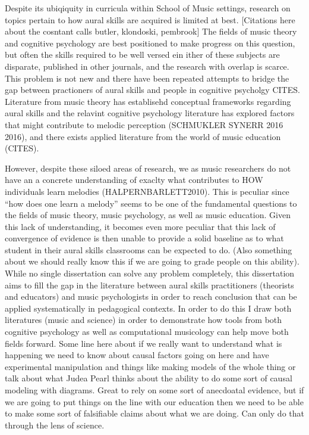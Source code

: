 \documentclass[]{book}
\begin{document}
Despite its ubiqiquity in curricula within School of Music settings, research on topics pertain to how aural skills are acquired is limited at best.
{[}Citations here about the cosntant calls butler, klondoski, pembrook{]}
The fields of music theory and cognitive psychology are best positioned to make progress on this question, but often the skills required to be well versed ein ither of these subjects are disparate, published in other journals, and the research with overlap is scarce.
This problem is not new and there have been repeated attempts to bridge the gap between practioners of aural skills and people in cognitive psycholgy CITES.
Literature from music theory has establisehd conceptual frameworks regarding aural skills \citet{karpinskiAuralSkillsAcquisition2000} and the relavint cognitive psychology literature has explored factors that might contribute to melodic perception (SCHMUKLER SYNERR 2016 2016), and there exists applied literature from the world of music education (CITES).

However, despite these siloed areas of research, we as music researchers do not have an a concrete understanding of exaclty what contributes to HOW individuals learn melodies (HALPERNBARLETT2010).
This is peculiar since ``how does one learn a melody'' seems to be one of the fundamental questions to the fields of music theory, music psychology, as well as music education.
Given this lack of understanding, it becomes even more peculiar that this lack of convergence of evidence is then unable to provide a solid baseline as to what student in their aural skills classrooms can be expected to do. (Also something about we should really know this if we are going to grade people on this ability).
While no single dissertation can solve any problem completely, this dissertation aims to fill the gap in the literature between aural skills practitioners (theorists and educators) and music psychologists in order to reach conclusion that can be applied systematically in pedagogical contexts.
In order to do this I draw both literatures (music and science) in order to demonstrate how tools from both cognitive psychology as well as computational musicology can help move both fields forward.
Some line here about if we really want to understand what is happening we need to know about causal factors going on here and have experimental manipulation and things like making models of the whole thing or talk about what Judea Pearl thinks about the ability to do some sort of causal modeling with diagrams.
Great to rely on some sort of anecdoatal evidence, but if we are going to put things on the line with our education then we need to be able to make some sort of falsifiable claims about what we are doing.
Can only do that through the lens of science.
\end{document}
